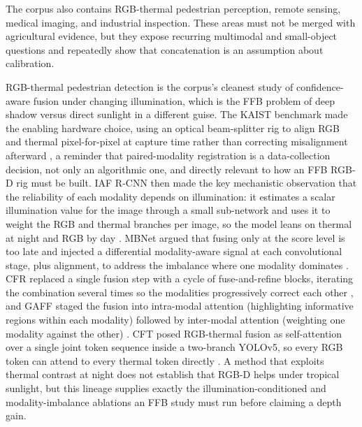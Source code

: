 The corpus also contains RGB-thermal pedestrian perception, remote sensing, medical imaging, and industrial inspection. These areas must not be merged with agricultural evidence, but they expose recurring multimodal and small-object questions and repeatedly show that concatenation is an assumption about calibration.

RGB-thermal pedestrian detection is the corpus's cleanest study of confidence-aware fusion under changing illumination, which is the FFB problem of deep shadow versus direct sunlight in a different guise. The KAIST benchmark made the enabling hardware choice, using an optical beam-splitter rig to align RGB and thermal pixel-for-pixel at capture time rather than correcting misalignment afterward \cite{hwang2015kaist}, a reminder that paired-modality registration is a data-collection decision, not only an algorithmic one, and directly relevant to how an FFB RGB-D rig must be built. IAF R-CNN then made the key mechanistic observation that the reliability of each modality depends on illumination: it estimates a scalar illumination value for the image through a small sub-network and uses it to weight the RGB and thermal branches per image, so the model leans on thermal at night and RGB by day \cite{li2019illumination}. MBNet argued that fusing only at the score level is too late and injected a differential modality-aware signal at each convolutional stage, plus alignment, to address the imbalance where one modality dominates \cite{zhou2020mbnet}. CFR replaced a single fusion step with a cycle of fuse-and-refine blocks, iterating the combination several times so the modalities progressively correct each other \cite{zhang2020cfr}, and GAFF staged the fusion into intra-modal attention (highlighting informative regions within each modality) followed by inter-modal attention (weighting one modality against the other) \cite{zhang2021gaff}. CFT posed RGB-thermal fusion as self-attention over a single joint token sequence inside a two-branch YOLOv5, so every RGB token can attend to every thermal token directly \cite{fang2022cft}. A method that exploits thermal contrast at night does not establish that RGB-D helps under tropical sunlight, but this lineage supplies exactly the illumination-conditioned and modality-imbalance ablations an FFB study must run before claiming a depth gain.


